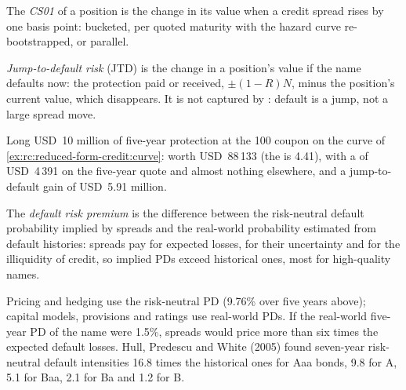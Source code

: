 \begin{definition}[CS01]\label{def:rc:reduced-form-credit:cs01}
The \emph{CS01} of a position is the change in its value when a credit
spread rises by one basis point: bucketed, per quoted maturity with the hazard curve
re-bootstrapped, or parallel.
\end{definition}

\begin{definition}\label{def:rc:reduced-form-credit:jtd}
\emph{Jump-to-default risk} (JTD) is the change in a
position's value if the name defaults now: the protection paid or received,
$\pm(1-R)N$, minus the position's current value, which disappears. It is not captured by
: default is a jump, not a large spread move.
\end{definition}

\begin{example}\label{ex:rc:reduced-form-credit:position}
Long USD~10 million of five-year protection at the 100 coupon on the curve of
\cref{ex:rc:reduced-form-credit:curve}: worth USD~88\,133 (the  is 4.41),
with a  of USD~4\,391 on the five-year quote and almost nothing elsewhere, and a
jump-to-default gain of USD~5.91 million.
\end{example}

\begin{definition}\label{def:rc:reduced-form-credit:premium}
The \emph{default risk premium} is the difference between
the risk-neutral default probability implied by spreads and the real-world probability
estimated from default histories: spreads pay for expected losses, for their
uncertainty and for the illiquidity of credit, so implied PDs exceed historical ones,
most for high-quality names.
\end{definition}

\begin{remark}\label{rem:rc:reduced-form-credit:which}
Pricing and hedging use the risk-neutral PD (9.76\% over five years above); capital
models, provisions and ratings use real-world PDs. If the real-world five-year PD of the
name were 1.5\%, spreads would price more than six times the expected default losses. Hull,
Predescu and White (2005) found seven-year risk-neutral default intensities 16.8 times the historical
ones for Aaa bonds, 9.8 for A, 5.1 for Baa, 2.1 for Ba and 1.2 for B.
\end{remark}

